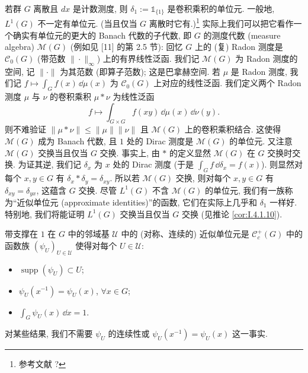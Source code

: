 \begin{remark}
\label{rem:I.4.1.6}
若群 $G$ 离散且 $dx$ 是计数测度, 则 $\delta_1 := \mathbb{1}_{\{1\}}$ 是卷积乘积的单位元. 一般地, $L^1(G)$ 不一定有单位元. (当且仅当 $G$ 离散时它有.)\footnote{参考文献 ?} 实际上我们可以把它看作一个确实有单位元的更大的 Banach 代数的子代数, 即 $G$ 的测度代数 (measure algebra) $\mathcal{M}(G)$ (例如见 {[}11{]} 的第 2.5 节):
回忆 $G$ 上的 (复) Radon 测度是 $\mathcal{C}_0(G)$ (带范数 $\|\cdot\|_{\infty}$) 上的有界线性泛函. 我们记 $\mathcal{M}(G)$ 为 Radon 测度的空间, 记 $\|\cdot\|$ 为其范数 (即算子范数); 这是巴拿赫空间. 若 $\mu$ 是 Radon 测度, 我们记 $f \longmapsto \int_G f(x)\,\dd\mu(x)$ 为 $\mathcal{C}_0(G)$ 上对应的线性泛函. 我们定义两个 Radon 测度 $\mu$ 与 $\nu$ 的卷积乘积 $\mu * \nu$ 为线性泛函
\[
f \longmapsto \int_{G \times G} f(xy)\,\dd\mu(x)\,\dd\nu(y).
\]
则不难验证 $\|\mu * \nu\| \leq \|\mu\|\|\nu\|$ 且 $\mathcal{M}(G)$ 上的卷积乘积结合. 这使得 $\mathcal{M}(G)$ 成为 Banach 代数, 且 $1$ 处的 Dirac 测度是 $\mathcal{M}(G)$ 的单位元.
又注意 $\mathcal{M}(G)$ 交换当且仅当 $G$ 交换. 事实上, 由 $*$ 的定义显然 $\mathcal{M}(G)$ 在 $G$ 交换时交换. 为证其逆, 我们记 $\delta_x$ 为 $x$ 处的 Dirac 测度 (于是 $\int_G f\,\dd\delta_x = f(x)$). 则显然对每个 $x, y \in G$ 有 $\delta_x * \delta_y = \delta_{xy}$. 所以若 $\mathcal{M}(G)$ 交换, 则对每个 $x, y \in G$ 有 $\delta_{xy} = \delta_{yx}$, 这蕴含 $G$ 交换.
尽管 $L^1(G)$ 不含 $\mathcal{M}(G)$ 的单位元, 我们有一族称为``近似单位元 (approximate identities)''的函数, 它们在实际上几乎和 $\delta_1$ 一样好. 特别地, 我们将能证明 $L^1(G)$ 交换当且仅当 $G$ 交换 (见推论 \ref{cor:I.4.1.10}).
\end{remark}

\begin{definition}
\label{def:I.4.1.7}
带支撑在 $1$ 在 $G$ 中的邻域基 $\mathcal{U}$ 中的 (对称、连续的) 近似单位元是 $\mathcal{C}_c^+(G)$ 中的函数族 $(\psi_U)_{U \in \mathcal{U}}$ 使得对每个 $U \in \mathcal{U}$:
\begin{itemize}
\item $\operatorname{supp}(\psi_U) \subset U$;
\item $\psi_U(x^{-1}) = \psi_U(x)$, $\forall x \in G$;
\item $\int_G \psi_U(x)\,\dd x = 1$.
\end{itemize}
\end{definition}

对某些结果, 我们不需要 $\psi_U$ 的连续性或 $\psi_U(x^{-1}) = \psi_U(x)$ 这一事实.


